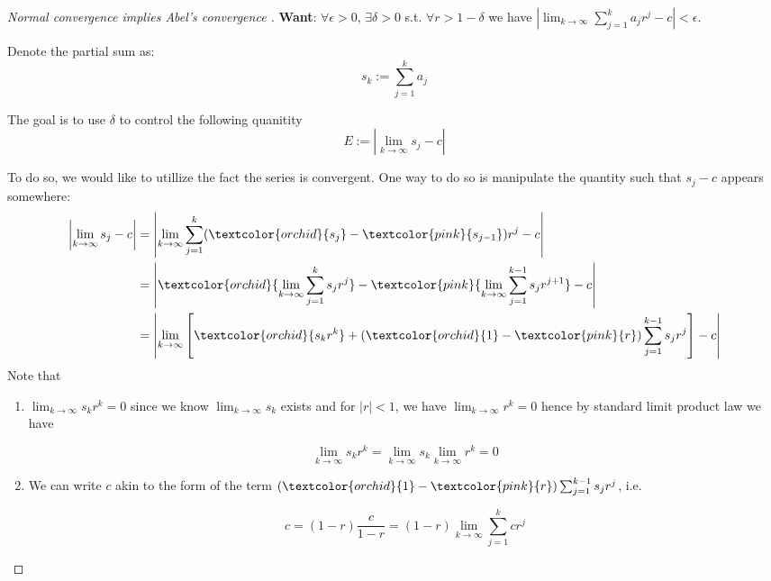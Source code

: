 \begin{proof}[Normal convergence implies Abel's convergence ]\textbf{Want}: $\forall \epsilon >0$, $\exists \delta >0$
s.t. $\forall r > 1 -\delta$ we have $\left|\lim_{k\to \infty}\sum_{j=1}^k a_jr^j - c\right|<\epsilon$.

Denote the partial sum as:
\begin{equation}
s_k :=\sum_{j=1}^k a_j
\end{equation}

The goal is to use $\delta$ to control the following quanitity
\begin{equation}
E:=\left|\lim_{k\to \infty}s_j - c\right|
\end{equation}

To do so, we would like to utillize the fact the series is convergent. One way to do so is  manipulate the quantity such that $s_j -c$ appears somewhere:
\begin{equation}
\begin{aligned}
\left|\lim_{k\to \infty}s_j - c\right| &= \left|\lim_{k\to \infty}\sum_{j=1}^k (\textcolor{orchid}{s_j}-\textcolor{pink}{s_{j-1}})r^j - c\right| \\
&= 
\left|\textcolor{orchid}{\lim_{k\to \infty}\sum_{j=1}^k s_jr^j} -  \textcolor{pink}{\lim_{k\to \infty}\sum_{j=1}^{k-1} s_jr^{j+1}} - c\right| \\
&= 
\left| \lim_{k\to\infty}\left[\textcolor{orchid}{s_kr^k} + (\textcolor{orchid}{1}-\textcolor{pink}{r})\sum_{j=1}^{k-1}s_jr^j\right]-c\right|
\end{aligned}
\end{equation}
Note that

\begin{enumerate}
\item $\lim_{k\to \infty}s_kr^k = 0$ since we know $\lim_{k\to \infty}s_k$ exists and for $|r|<1$, we have $\lim_{k\to\infty}{r^k}=0$ hence by standard limit product law we have

\begin{equation}
\lim_{k\to \infty}s_kr^k=\lim_{k\to \infty}s_k\lim_{k\to \infty}r^k=0
\end{equation}


\item We can write $c$ akin to the form of the term $(\textcolor{orchid}{1} -\textcolor{pink}{r})\sum_{j=1}^{k -1}s_jr^j$, i.e.

\begin{equation}
c=(1-r)\frac{c}{1-r}=(1-r)\lim_{k\to\infty}\sum_{j=1}^k cr^j
\end{equation}
\end{enumerate}


\end{proof}
